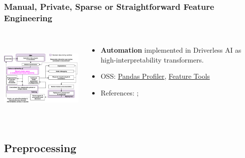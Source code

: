 \documentclass[11pt,
               aspectratio=169,
               hyperref={colorlinks}
               ]{beamer}
\begin{document}
			\begin{frame}
		
				\frametitle{Manual, Private, Sparse or Straightforward Feature Engineering }		
		
				\begin{columns}
	
					\centering
					\includegraphics[height=120pt]{img/fe.png}
				
					\vspace{-5pt}
					\begin{itemize}
						\item \textbf{Automation} implemented in Driverless AI as high-interpretability transformers.
						\item OSS: \href{https://github.com/pandas-profiling/pandas-profiling}{Pandas Profiler}, \href{https://index.pocketcluster.io/featuretools-featuretools.html}{Feature Tools}
						\item References: ; 
					\end{itemize}
				
				\end{columns}		
		
			\end{frame}
	
		\subsection{Preprocessing}
	
\end{document}
